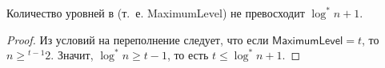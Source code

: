 \begin{lem} \label{th:log*-levels}
Количество уровней в \CH[*] (т.~е. \textsf{MaximumLevel}) не превосходит
$\log^* n + 1$.
\end{lem}
\begin{proof}
Из условий на переполнение следует, что если $\mathsf{MaximumLevel} = t$,
то $n \geq {}^{t-1}2$. Значит, $\log^* n \geq t-1$, то есть
$t \leq \log^* n + 1$.
\end{proof}


